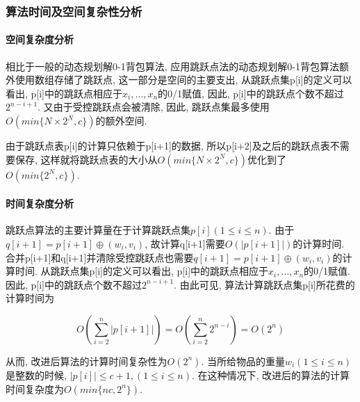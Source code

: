 \subsubsection{算法时间及空间复杂性分析}
\paragraph{空间复杂度分析}
\label{par:jumpPointSpace}
相比于一般的动态规划解0-1背包算法,
应用跳跃点法的动态规划解0-1背包算法额外使用数组存储了跳跃点,
这一部分是空间的主要支出, 从跳跃点集p[i]的定义可以看出,
p[i]中的跳跃点相应于$x_i, \dots, x_n$的0/1赋值, 因此,
p[i]中的跳跃点个数不超过$2^{n-i+1}$. 又由于受控跳跃点会被清除, 因此,
跳跃点集最多使用$O(min\{N\times 2^{N}, c\})$的额外空间.\par

由于跳跃点表p[i]的计算只依赖于p[i+1]的数据,
所以p[i+2]及之后的跳跃点表不需要保存,
这样就将跳跃点表的大小从$O(min\{N\times 2^N, c\})$优化到了$O(min\{2^N, c\})$.

\paragraph{时间复杂度分析}
\label{par:jumpPointTime}
跳跃点算法的主要计算量在于计算跳跃点集$p[i](1\leq i\leq n)$.
由于$q[i+1]=p[i+1]\oplus (w_i,v_i)$, 故计算q[i+1]需要$O(|p[i+1]|)$的计算时间.
合并p[i+1]和q[i+1]并清除受控跳跃点也需要$q[i+1]=p[i+1]\oplus
	(w_i,v_i)$的计算时间. 从跳跃点集p[i]的定义可以看出,
p[i]中的跳跃点相应于$x_i,\dots,x_n$的0/1赋值. 因此,
p[i]中的跳跃点个数不超过$2^{n-i+1}$. 由此可见,
算法计算跳跃点集p[i]所花费的计算时间为

\begin{equation}
	O(\sum^n_{i=2}|p[i+1]|)=O(\sum^n_{i=2}2^{n-i})=O(2^n)
	\label{eq:jumpPointTime}
\end{equation}

从而, 改进后算法的计算时间复杂性为$O(2^n)$. 当所给物品的重量$w_i(1\leq i\leq n)$
是整数的时候, $|p[i]|\leq c+1, (1\leq i\leq n)$. 在这种情况下,
改进后的算法的计算时间复杂度为$O(min\{nc, 2^n\})$.

